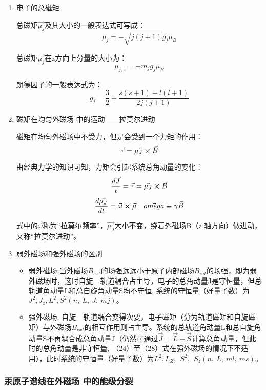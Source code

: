 \documentclass[dvipsnames, svgnames,a4paper,11pt]{article}
\begin{document}
		\begin{enumerate}
			\item 电子的总磁矩
			
				总磁矩$\vec{\mu_j}$及其大小的一般表达式可写成：
					\[
						\mu_j = -\sqrt{j(j+1)}g_j \mu_B
					\]

				总磁矩$\vec{\mu_j}$在z方向上分量的大小为：
					\[
						\mu_{j,z} = - m_j g_j \mu_B	
					\]

				朗德因子的一般表达式为：
					\[
						g_j=\frac{3}{2}+\frac{s\left(s+1\right)-l\left(l+1\right)}{2j\left(j+1\right)}	
					\]

			\item 磁矩在均匀外磁场 中的运动——拉莫尔进动
			
				磁矩在均匀外磁场中不受力，但是会受到一个力矩的作用：
				\[
					\vec{\tau} = \vec{\mu_J} \cross \vec{B}	
				\]

				由经典力学的知识可知，力矩会引起系统总角动量的变化：
				\[
					\frac{d \vec{J}}{t} = \vec{\tau} = \vec{\mu_J} \cross \vec{B}
				\]
				\[
					\frac{d \vec{\mu_J}}{d t} = \vec{\omega} \cross \vec{\mu} \quad \vec{omega} \equiv \gamma \vec{B}
				\]
				
				式中的$\vec{\omega}$称为“拉莫尔频率”，$\vec{\mu_J}$大小不变，绕着外磁场B（z 轴方向）做进动，又称“拉莫尔进动”。

			\item 弱外磁场和强外磁场的区别
			
				\begin{itemize}
					\item 弱外磁场:当外磁场$B_{ext}$的场强远远小于原子内部磁场$B_{int}$的场强，即为弱外磁场时，这时自旋—轨道耦合占主导，电子的总角动量J是守恒量，但总轨道角动量L和总自旋角动量S均不守恒, 系统的守恒量（好量子数）为$J^2,J_z,L^2,S^2\left(n,\ L,\ J,\ mj\right)。$
					\item 强外磁场: 自旋—轨道耦合变得次要，电子磁矩（分为轨道磁矩和自旋磁矩）与外磁场$B_{ext}$的相互作用则占主导。系统的总轨道角动量L和总自旋角动量S不再耦合成总角动量J（仍然可通过$\vec{J}=\vec{L}+\vec{S}$计算总角动量，但此时的总角动量是非守恒量, （24）至（28）式在强外磁场的情况下不适用），此时系统的守恒量（好量子数）为$L^2,L_Z,\ \ S^2,\ {\ S}_z\left(n,\ L,\ ml,\ ms\right)$。
				\end{itemize}
		\end{enumerate}





	\subsubsection{汞原子谱线在外磁场 中的能级分裂}
\end{document}
